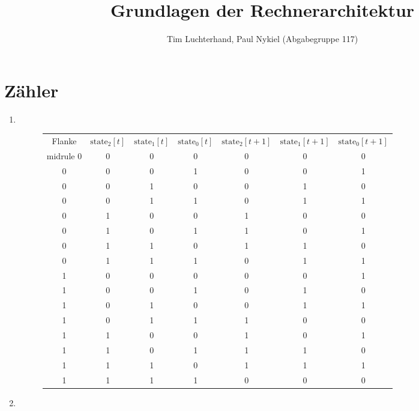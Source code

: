 \documentclass[DIN, pagenumber=false, fontsize=11pt, parskip=half]{scrartcl}
\title{Grundlagen der Rechnerarchitektur}
\author{Tim Luchterhand, Paul Nykiel (Abgabegruppe 117)}
\begin{document}
    \maketitle
    \section{Zähler}
    \begin{enumerate}[label=(\alph*)]
        \item $ $
            \begin{figure}[H]
                \centering
                \begin{tabular}{c|ccc|ccc}
                    \toprule
                    Flanke & $\text{state}_2[t]$ & $\text{state}_1[t]$ & $\text{state}_0[t]$ & $\text{state}_2[t+1]$ & $\text{state}_1[t+1]$ & $\text{state}_0[t+1]$ \\
                    midrule
                    0 & 0 & 0 & 0 & 0 & 0 & 0\\
                    0 & 0 & 0 & 1 & 0 & 0 & 1\\
                    0 & 0 & 1 & 0 & 0 & 1 & 0\\
                    0 & 0 & 1 & 1 & 0 & 1 & 1\\
                    0 & 1 & 0 & 0 & 1 & 0 & 0\\
                    0 & 1 & 0 & 1 & 1 & 0 & 1\\
                    0 & 1 & 1 & 0 & 1 & 1 & 0\\
                    0 & 1 & 1 & 1 & 0 & 1 & 1\\
                    1 & 0 & 0 & 0 & 0 & 0 & 1\\
                    1 & 0 & 0 & 1 & 0 & 1 & 0\\
                    1 & 0 & 1 & 0 & 0 & 1 & 1\\
                    1 & 0 & 1 & 1 & 1 & 0 & 0\\
                    1 & 1 & 0 & 0 & 1 & 0 & 1\\
                    1 & 1 & 0 & 1 & 1 & 1 & 0\\
                    1 & 1 & 1 & 0 & 1 & 1 & 1\\
                    1 & 1 & 1 & 1 & 0 & 0 & 0\\
                    \bottomrule
                \end{tabular}
            \end{figure}
        \item
            \begin{eqnarray*}

\end{eqnarray*}
\end{enumerate}
\end{document}
